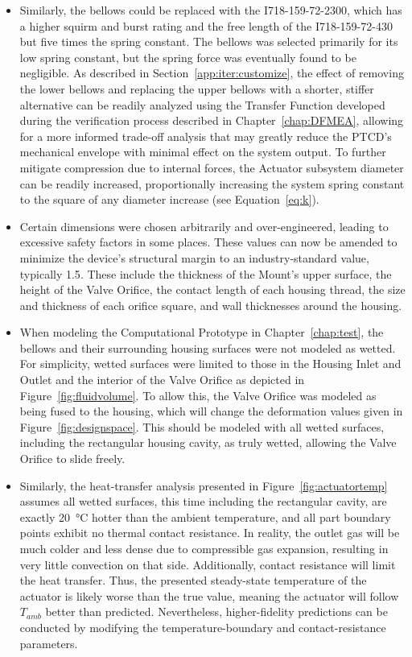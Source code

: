 \documentclass[12pt, letterpaper]{report}%
\newcounter{mycounter}           %
\newcounter{sub}[mycounter]      %
\newcommand{\device}{PTCD}
\begin{document}
\begin{appendices}
\begin{itemize}
			\item Similarly, the bellows could be replaced with the I718-159-72-2300\cite{ref_miniflex_catalog}, which has a higher squirm and burst rating and  the free length of the I718-159-72-430
				but five times the spring constant. The bellows was selected primarily for its low spring constant, but the spring force was eventually found to be negligible.
				As described in Section~\ref{app:iter:customize}, the effect of removing the lower bellows and replacing the upper bellows with a shorter, stiffer alternative
				can be readily analyzed using the Transfer Function developed during the verification process described in Chapter~\ref{chap:DFMEA},
				allowing for a more informed trade-off analysis that may greatly reduce the \device's mechanical envelope with minimal effect on the system output.
				To further mitigate compression due to internal forces, the Actuator subsystem diameter can be readily increased, proportionally increasing the system spring constant to the square of any diameter increase
				(see Equation~\eqref{eq:k}).
			\item Certain dimensions were chosen arbitrarily and over-engineered, leading to excessive safety factors in some places. These values can now be amended to minimize the device's structural margin
				to an industry-standard value, typically 1.5\cite{ref_sf}. These include the thickness of the Mount's upper surface, the height of the Valve Orifice, the contact length of each housing thread,
				the size and thickness of each orifice square, and wall thicknesses around the housing.
			\item When modeling the Computational Prototype in Chapter~\ref{chap:test}, the bellows and their surrounding housing surfaces were not modeled as wetted. For simplicity, wetted surfaces
				were limited to those in the Housing Inlet and Outlet and the interior of the Valve Orifice as depicted in Figure~\ref{fig:fluidvolume}. To allow this, the Valve Orifice was modeled
				as being fused to the housing, which will change the deformation values given in Figure~\ref{fig:designspace}. This should be modeled with all wetted surfaces, including the rectangular
				housing cavity, as truly wetted, allowing the Valve Orifice to slide freely.
			\item Similarly, the heat-transfer analysis presented in Figure~\ref{fig:actuatortemp} assumes all wetted surfaces, this time including the rectangular cavity,
				are exactly \SI{20}{\degreeCelsius} hotter than the ambient temperature, and all part boundary points exhibit no thermal contact resistance.
				In reality, the outlet gas will be much colder and less dense due to compressible gas expansion, resulting in very little convection on that side. Additionally, contact resistance will
				limit the heat transfer. Thus, the presented steady-state temperature of the actuator is likely worse than the true value, meaning the actuator will follow $T_{amb}$ better than predicted.
				Nevertheless, higher-fidelity predictions can be conducted by modifying the temperature-boundary and contact-resistance parameters. 
		\end{itemize}


\end{appendices}
\end{document}
